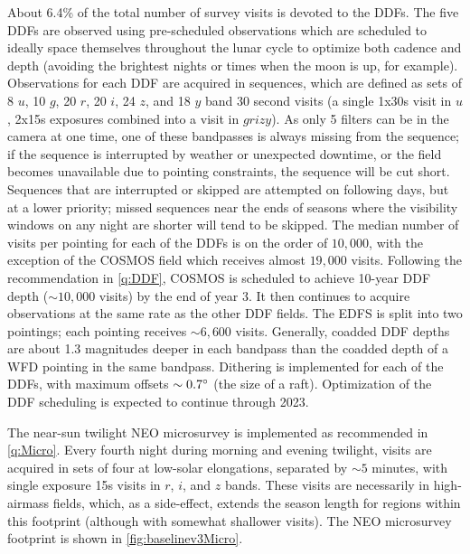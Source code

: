\hangindent=0.7cm About 6.4\% of the total number of survey visits is devoted to the DDFs. The five DDFs are observed using pre-scheduled observations which are scheduled to ideally space themselves throughout the lunar cycle to optimize both cadence and depth (avoiding the brightest nights or times when the moon is up, for example). Observations for each DDF are acquired in sequences, which are defined as sets of 8 $u$, 10 $g$, 20 $r$, 20 $i$, 24 $z$, and 18 $y$ band 30 second visits (a single 1x30s visit in $u$, 2x15s exposures combined into a visit in $grizy$). As only 5 filters can be in the camera at one time, one of these bandpasses is always missing from the sequence; if the sequence is interrupted by weather or unexpected downtime, or the field becomes unavailable due to pointing constraints, the sequence will be cut short. Sequences that are interrupted or skipped are attempted on following days, but at a lower priority; missed sequences near the ends of seasons where the visibility windows on any night are shorter will tend to be skipped. The median number of visits per pointing for each of the DDFs is on the order of $10,000$, with the exception of the COSMOS field which receives almost $19,000$ visits. Following the recommendation in \autoref{q:DDF}, COSMOS is scheduled to achieve 10-year DDF depth ($\sim10,000$ visits) by the end of year 3. It then continues to acquire observations at the same rate as the other DDF fields. The EDFS is split into two pointings; each pointing receives $\sim6,600$ visits. Generally, coadded DDF depths are about 1.3 magnitudes deeper in each bandpass than the coadded depth of a WFD pointing in the same bandpass. Dithering is implemented for each of the DDFs, with maximum offsets $\sim0.7^{\circ}$ (the size of a raft). Optimization of the DDF scheduling is expected to continue through 2023.

\hangindent=0.7cm The near-sun twilight NEO microsurvey is implemented as recommended in \autoref{q:Micro}. Every fourth night during morning and evening twilight, visits are acquired in sets of four at low-solar elongations, separated by $\sim5$ minutes, with single exposure 15s visits in $r$, $i$, and $z$ bands. These visits are necessarily in high-airmass fields, which, as a side-effect, extends the season length for regions within this footprint (although with somewhat shallower visits). The NEO microsurvey footprint is shown in \autoref{fig:baselinev3Micro}.


